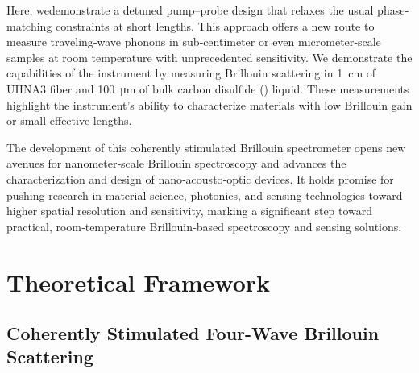 Here, wedemonstrate a detuned pump–probe design that relaxes the usual phase‐matching constraints at short lengths. This approach offers a new route to measure traveling‐wave phonons in sub‐centimeter or even micrometer‐scale samples at room temperature with unprecedented sensitivity. We demonstrate the capabilities of the instrument by measuring Brillouin scattering in \SI{1}{\centi\meter} of \ac{UHNA3} fiber and \SI{100}{\micro\meter} of bulk carbon disulfide () liquid. These measurements highlight the instrument’s ability to characterize materials with low Brillouin gain or small effective lengths.

The development of this coherently stimulated Brillouin spectrometer opens new avenues for nanometer‐scale Brillouin spectroscopy and advances the characterization and design of nano‐acousto‐optic devices. It holds promise for pushing research in material science, photonics, and sensing technologies toward higher spatial resolution and sensitivity, marking a significant step toward practical, room‐temperature Brillouin‐based spectroscopy and sensing solutions.

\section{Theoretical Framework}
\label{Theoretical Framework}

\subsection{Coherently Stimulated Four-Wave Brillouin Scattering}
\label{Theoretical Framework:Coherently stimulated five-wave Brillouin scattering}

